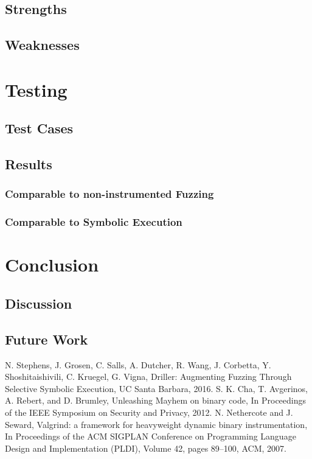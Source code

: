 \documentclass[a4paper]{article}
\begin{document}
\subsection{Strengths}
\subsection{Weaknesses}


\section{Testing}
\subsection{Test Cases}
\subsection{Results}
\subsubsection*{Comparable to non-instrumented Fuzzing}
\subsubsection*{Comparable to Symbolic Execution}

\section{Conclusion}
\subsection{Discussion}
\subsection{Future Work}
\begin{thebibliography}{9}
	N. Stephens, J. Grosen, C. Salls, A. Dutcher, R. Wang, J. Corbetta, Y. Shoshitaishivili, C. Kruegel, G.  Vigna,
	Driller: Augmenting Fuzzing Through Selective Symbolic Execution,
	UC Santa Barbara,
	2016.
	S. K. Cha, T. Avgerinos, A. Rebert, and D. Brumley,
	Unleashing Mayhem on binary code,
	In Proceedings of the IEEE Symposium on Security and Privacy,
	2012.
	N. Nethercote and J. Seward,
	Valgrind: a framework for heavyweight dynamic binary instrumentation, 
	In Proceedings of the ACM SIGPLAN Conference on Programming Language Design and Implementation (PLDI),
	Volume 42,
	pages 89–100, 
	ACM,
	2007.
\end{thebibliography}
\end{document}
